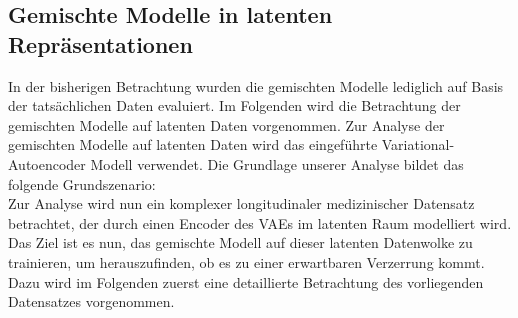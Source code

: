 \documentclass[%
thesis=student,%
coverpage=false,%
titlepage=false,%
headmarks=true, %
german,%
font=libertine, %
math=newpxtx, %
BCOR=5mm,%
coverBCOR=11mm%
]{tumbook}
\theoremstyle{break}
\begin{document}
\subsection{Gemischte Modelle in latenten Repräsentationen}
In der bisherigen Betrachtung wurden die gemischten Modelle lediglich auf Basis der tatsächlichen Daten evaluiert. Im Folgenden wird die Betrachtung der gemischten Modelle auf latenten Daten vorgenommen. Zur Analyse der gemischten Modelle auf latenten Daten wird das eingeführte Variational-Autoencoder Modell verwendet. Die Grundlage unserer Analyse bildet das folgende Grundszenario: \\
Zur Analyse wird nun ein komplexer longitudinaler medizinischer Datensatz betrachtet, der durch einen Encoder des VAEs im latenten Raum modelliert wird. Das Ziel ist es nun, das gemischte Modell auf dieser latenten Datenwolke zu trainieren, um herauszufinden, ob es zu einer erwartbaren Verzerrung kommt. Dazu wird im Folgenden zuerst eine detaillierte Betrachtung des vorliegenden Datensatzes vorgenommen.
\end{document}
